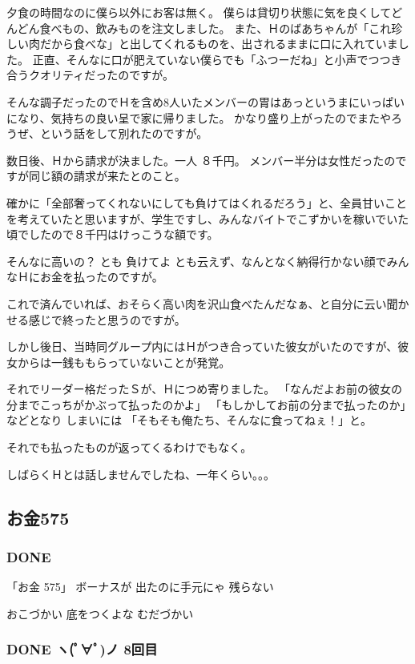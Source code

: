 \documentclass[11pt]{article}
\begin{document}
夕食の時間なのに僕ら以外にお客は無く。
僕らは貸切り状態に気を良くしてどんどん食べもの、飲みものを注文しました。
また、Ｈのばあちゃんが「これ珍しい肉だから食べな」と出してくれるものを、出されるままに口に入れていました。
正直、そんなに口が肥えていない僕らでも「ふつーだね」と小声でつつき合うクオリティだったのですが。

そんな調子だったのでＨを含め8人いたメンバーの胃はあっというまにいっぱいになり、気持ちの良い呈で家に帰りました。
かなり盛り上がったのでまたやろうぜ、という話をして別れたのですが。

数日後、Ｈから請求が決ました。一人 ８千円。
メンバー半分は女性だったのですが同じ額の請求が来たとのこと。

確かに「全部奢ってくれないにしても負けてはくれるだろう」と、全員甘いことを考えていたと思いますが、学生ですし、みんなバイトでこずかいを稼いでいた頃でしたので８千円はけっこうな額です。

そんなに高いの？ とも 負けてよ とも云えず、なんとなく納得行かない顔でみんなＨにお金を払ったのですが。

これで済んでいれば、おそらく高い肉を沢山食べたんだなぁ、と自分に云い聞かせる感じで終ったと思うのですが。

しかし後日、当時同グループ内にはＨがつき合っていた彼女がいたのですが、彼女からは一銭ももらっていないことが発覚。

それでリーダー格だったＳが、Ｈにつめ寄りました。
「なんだよお前の彼女の分までこっちがかぶって払ったのかよ」
「もしかしてお前の分まで払ったのか」などとなり
しまいには
「そもそも俺たち、そんなに食ってねぇ！」と。

それでも払ったものが返ってくるわけでもなく。

しばらくＨとは話しませんでしたね、一年くらい。。。
\subsection{お金575}
\label{sec-103_2}
\subsubsection{\textbf{DONE}}
\label{sec-103_2_1}

「お金 575」
ボーナスが 出たのに手元にゃ 残らない

おこづかい 底をつくよな むだづかい
\subsubsection{\textbf{DONE} ヽ(ﾟ∀ﾟ)ノ 8回目}
\label{sec-103_2_2}
\end{document}
